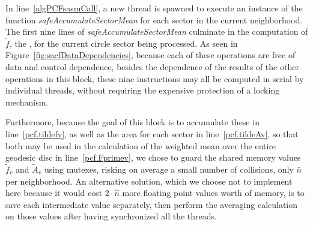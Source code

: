 In line~\ref{algPCFsasmCall}, a new thread is spawned to execute an instance of the function \textit{safeAccumulateSectorMean} for each sector in the current neighborhood. The first nine lines of \textit{safeAccumulateSectorMean} culminate in the computation of $\check{f}$, the \wmfv{}, for the current circle sector being processed. As seen in Figure~\ref{fig:sacfDataDependencies}, because each of these operations are free of data and control dependence, besides the dependence of the results of the other operations in this block, these nine instructions may all be computed in serial by individual threads, without requiring the expensive protection of a locking mechanism.

Furthermore, because the goal of this block is to accumulate these  in line~\ref{pcf.tildefv}, as well as the area for each sector in line~\ref{pcf.tildeAv}, so that both may be used in the calculation of the weighted mean over the entire geodesic disc in line~\ref{pcf.Fprimev}, we chose to guard the shared memory values $\tilde{f}_v$ and $\tilde{A}_v$ using mutexes, risking on average a small number of collisions, only $\bar{n}$ per neighborhood. An alternative solution, which we choose not to implement here because it would cost $2\cdot\hat{n}$ more floating point values worth of memory, is to save each intermediate value separately, then perform the averaging calculation on those values after having synchronized all the threads.

